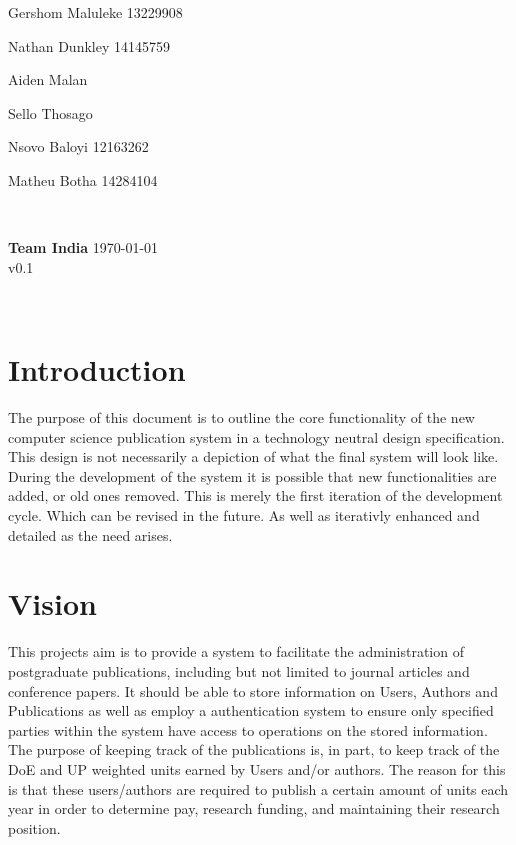 \documentclass{article}
\begin{document}
\begin{titlepage}
\begin{minipage}{0.5\textwidth}
\begin{flushleft}
	Gershom Maluleke 13229908


	Nathan Dunkley 14145759

	Aiden Malan

	Sello Thosago

	Nsovo Baloyi 12163262

	Matheu Botha 14284104
	\end{flushleft}
	\end{minipage}
	~
	\begin{minipage}{0.4\textwidth}
	\begin{flushright} \large
	{ \huge \bfseries Team India }%
	{\large \today}\\
	{\large v0.1}
	\end{flushright}
	\end{minipage}\\[4cm]
\end{titlepage}


	\newpage
	
	\section{Introduction}
	
	The purpose of this document is to outline the core functionality of the new computer science publication system in a technology neutral design specification. This design is not necessarily a depiction of what the final system will look like. During the development of the system it is possible that new functionalities are added, or old ones removed. This is merely the first iteration of the development cycle. Which can be revised in the future. As well as iterativly enhanced and detailed as the need arises. 

	\section{Vision}

	This projects aim is to provide a system to facilitate the administration of postgraduate publications, including but not limited to journal articles and conference papers. It should be able to store information on Users, Authors and Publications as well as employ a authentication system to ensure only specified parties within the system have access to operations on the stored information.
	The purpose of keeping track of the publications is, in part, to keep track of the DoE and UP weighted units earned by Users and/or authors. The reason for this is that these users/authors are required to publish a certain amount of units each year in order to determine pay, research funding, and maintaining their research position.
\end{document}
